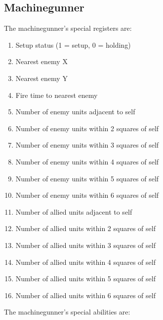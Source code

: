 \documentclass{article}
\begin{document}
\subsection*{Machinegunner}

The machinegunner's special registers are:

\begin{enumerate}[noitemsep]
    \item Setup status (1 = setup, 0 = holding)
    \item Nearest enemy X
    \item Nearest enemy Y
    \item Fire time to nearest enemy
    \item Number of enemy units adjacent to self
    \item Number of enemy units within 2 squares of self
    \item Number of enemy units within 3 squares of self
    \item Number of enemy units within 4 squares of self
    \item Number of enemy units within 5 squares of self
    \item Number of enemy units within 6 squares of self
    \item Number of allied units adjacent to self
    \item Number of allied units within 2 squares of self
    \item Number of allied units within 3 squares of self
    \item Number of allied units within 4 squares of self
    \item Number of allied units within 5 squares of self
    \item Number of allied units within 6 squares of self
\end{enumerate}

The machinegunner's special abilities are:
\end{document}
